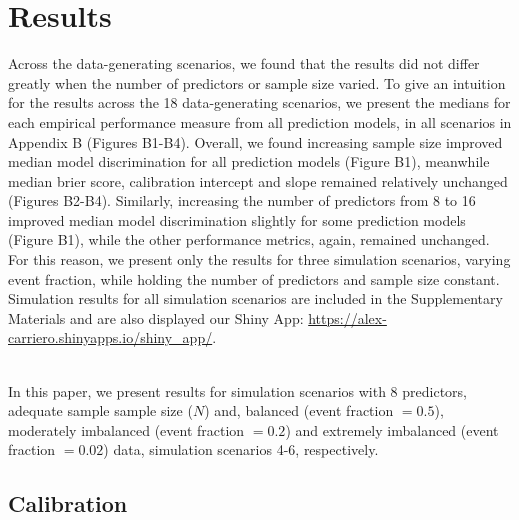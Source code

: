 \documentclass[AMA,STIX1COL,]{WileyNJD-v2}
\begin{document}
\hypertarget{results}{%
\section{Results}\label{results}}

Across the data-generating scenarios, we found that the results did not
differ greatly when the number of predictors or sample size varied. To
give an intuition for the results across the 18 data-generating
scenarios, we present the medians for each empirical performance measure
from all prediction models, in all scenarios in Appendix B (Figures
B1-B4). Overall, we found increasing sample size improved median model
discrimination for all prediction models (Figure B1), meanwhile median
brier score, calibration intercept and slope remained relatively
unchanged (Figures B2-B4). Similarly, increasing the number of
predictors from 8 to 16 improved median model discrimination slightly
for some prediction models (Figure B1), while the other performance
metrics, again, remained unchanged. For this reason, we present only the
results for three simulation scenarios, varying event fraction, while
holding the number of predictors and sample size constant. Simulation
results for all simulation scenarios are included in the Supplementary
Materials and are also displayed our Shiny App:
\url{https://alex-carriero.shinyapps.io/shiny_app/}.\\
\strut \\
In this paper, we present results for simulation scenarios with 8
predictors, adequate sample sample size (\(N\)) and, balanced (event
fraction \(= 0.5\)), moderately imbalanced (event fraction \(=0.2\)) and
extremely imbalanced (event fraction \(=0.02\)) data, simulation
scenarios 4-6, respectively.

\hypertarget{calibration}{%
\subsection{Calibration}\label{calibration}}
\end{document}
